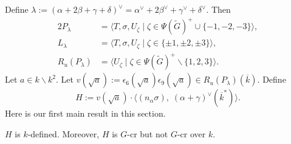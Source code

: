 Define
$\lambda:=(\alpha+2\beta+\gamma+\delta)^{\vee}=\alpha^{\vee}+2\beta^{\vee}+\gamma^{\vee}+\delta^{\vee}$. 
Then 
\begin{alignat*}{2}
P_\lambda&=\langle T, \sigma, U_{\zeta}\mid \zeta\in \Psi(\tilde G)^{+}\cup \{-1,-2,-3\} \rangle,\\
L_\lambda&=\langle T, \sigma, U_{\zeta}\mid \zeta\in \{\pm 1,\pm 2,\pm 3\} \rangle,\\
R_u(P_\lambda)&=\langle U_{\zeta} \mid \zeta \in \Psi(\tilde G)^{+}\backslash \{1, 2, 3\} \rangle.
\end{alignat*}
Let $a\in k\backslash k^2$. Let $v(\sqrt a):=\epsilon_{6}(\sqrt a)\epsilon_{9}(\sqrt a)\in R_u(P_\lambda)(\overline k)$. Define
\begin{equation*}
H:=v(\sqrt a)\cdot\langle (n_{\alpha}\sigma), \; (\alpha+\gamma)^{\vee}(\overline k^*) \rangle.
\end{equation*}
Here is our first main result in this section.
\begin{prop}\label{firstmain}
$H$ is $k$-defined. Moreover, $H$ is $G$-cr but not $G$-cr over $k$. 
\end{prop}
